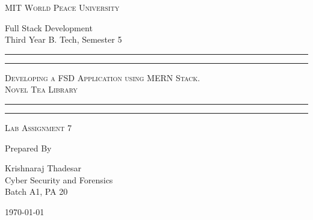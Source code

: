 \documentclass[11pt]{article}
\begin{document}
\begin{titlepage}
    \centering


    \huge\textsc{
        MIT World Peace University
    }\\

    \vspace{0.75\baselineskip} %

    \LARGE{
        Full Stack Development\\
        Third Year B. Tech, Semester 5
    }

    \vfill %


    \rule{\textwidth}{1.6pt}\vspace*{-\baselineskip}\vspace*{2pt}
    \rule{\textwidth}{0.6pt}
    \vspace{0.75\baselineskip} %



    \huge{\textsc{
            Developing a FSD Application using MERN Stack. \\
            Novel Tea Library
        }} \\



    \vspace{0.5\baselineskip} %
    \rule{\textwidth}{0.6pt}\vspace*{-\baselineskip}\vspace*{2.8pt}
    \rule{\textwidth}{1.6pt}

    \vspace{1\baselineskip} %


    \LARGE\textsc{
        Lab Assignment 7
    } %
    \vfill


    Prepared By
    \vspace{0.5\baselineskip} %

    \Large{
        Krishnaraj Thadesar \\
        Cyber Security and Forensics\\
        Batch A1, PA 20
    }


    \vspace{0.5\baselineskip} %
    \today

\end{titlepage}
\end{document}
